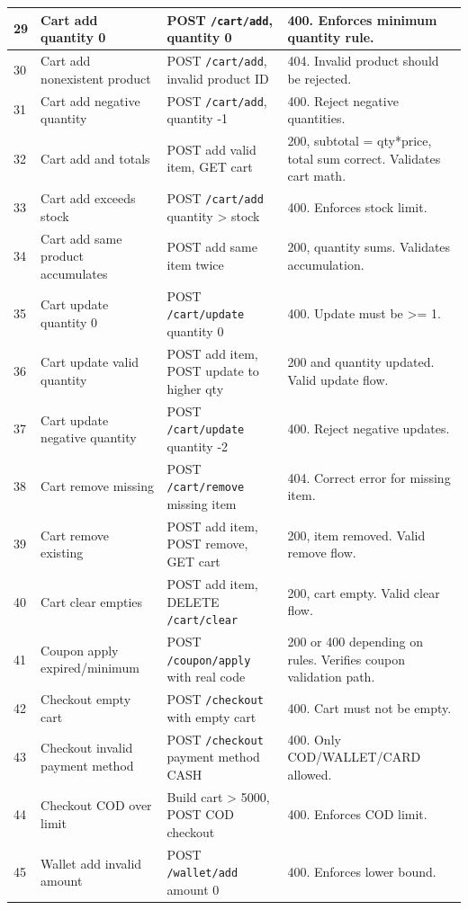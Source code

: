 \documentclass[11pt]{article}
\begin{document}
\begin{longtable}{|p{0.7cm}|p{3.2cm}|p{6.7cm}|p{3.2cm}|}
\hline
29 & Cart add quantity 0 & POST \texttt{/cart/add}, quantity 0 & 400. Enforces minimum quantity rule. \\
\hline
30 & Cart add nonexistent product & POST \texttt{/cart/add}, invalid product ID & 404. Invalid product should be rejected. \\
\hline
31 & Cart add negative quantity & POST \texttt{/cart/add}, quantity -1 & 400. Reject negative quantities. \\
\hline
32 & Cart add and totals & POST add valid item, GET cart & 200, subtotal = qty*price, total sum correct. Validates cart math. \\
\hline
33 & Cart add exceeds stock & POST \texttt{/cart/add} quantity > stock & 400. Enforces stock limit. \\
\hline
34 & Cart add same product accumulates & POST add same item twice & 200, quantity sums. Validates accumulation. \\
\hline
35 & Cart update quantity 0 & POST \texttt{/cart/update} quantity 0 & 400. Update must be >= 1. \\
\hline
36 & Cart update valid quantity & POST add item, POST update to higher qty & 200 and quantity updated. Valid update flow. \\
\hline
37 & Cart update negative quantity & POST \texttt{/cart/update} quantity -2 & 400. Reject negative updates. \\
\hline
38 & Cart remove missing & POST \texttt{/cart/remove} missing item & 404. Correct error for missing item. \\
\hline
39 & Cart remove existing & POST add item, POST remove, GET cart & 200, item removed. Valid remove flow. \\
\hline
40 & Cart clear empties & POST add item, DELETE \texttt{/cart/clear} & 200, cart empty. Valid clear flow. \\
\hline
41 & Coupon apply expired/minimum & POST \texttt{/coupon/apply} with real code & 200 or 400 depending on rules. Verifies coupon validation path. \\
\hline
42 & Checkout empty cart & POST \texttt{/checkout} with empty cart & 400. Cart must not be empty. \\
\hline
43 & Checkout invalid payment method & POST \texttt{/checkout} payment method CASH & 400. Only COD/WALLET/CARD allowed. \\
\hline
44 & Checkout COD over limit & Build cart > 5000, POST COD checkout & 400. Enforces COD limit. \\
\hline
45 & Wallet add invalid amount & POST \texttt{/wallet/add} amount 0 & 400. Enforces lower bound. \\

\end{longtable}
\end{document}

